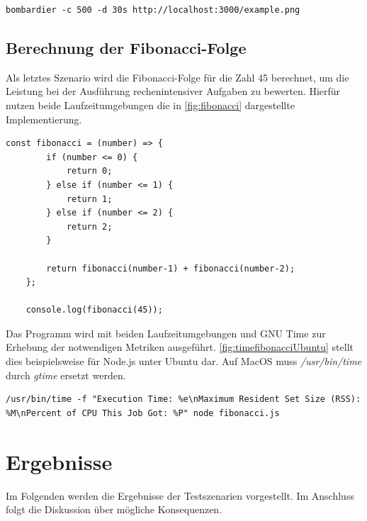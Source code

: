 \begin{lstlisting}[caption={[Bombardier Datei-Server]Bombardier Datei-Server\\\textit{Quelle: Eigene Darstellung}},label={fig:bombardierFileServer}]
	bombardier -c 500 -d 30s http://localhost:3000/example.png
\end{lstlisting}

\subsection{Berechnung der Fibonacci-Folge} \label{subsec:fibonacci}
Als letztes Szenario wird die Fibonacci-Folge für die Zahl 45 berechnet, um die Leistung bei der Ausführung rechenintensiver Aufgaben zu bewerten. Hierfür nutzen beide Laufzeitumgebungen die in \autoref{fig:fibonacci} dargestellte Implementierung.

\begin{lstlisting}[caption={[Berechnung der Fibonacci-Folge]Berechnung der Fibonacci-Folge\\\textit{Quelle: Eigene Darstellung}},label={fig:fibonacci}]
	const fibonacci = (number) => {
		if (number <= 0) {
			return 0;
		} else if (number <= 1) {
			return 1;
		} else if (number <= 2) {
			return 2;
		}
		
		return fibonacci(number-1) + fibonacci(number-2);
	};
	
	console.log(fibonacci(45));
\end{lstlisting}

\noindent
Das Programm wird mit beiden Laufzeitumgebungen und GNU Time zur Erhebung der notwendigen Metriken ausgeführt. \autoref{fig:timefibonacciUbuntu} stellt dies beispielsweise für Node.js unter Ubuntu dar. Auf MacOS muss \textit{/usr/bin/time} durch \textit{gtime} ersetzt werden.
\begin{lstlisting}[caption={[Messung der Fibonacci-Folge auf Ubuntu]Messung der Fibonacci-Folge auf Ubuntu\\\textit{Quelle: Eigene Darstellung}},label={fig:timefibonacciUbuntu}]
	/usr/bin/time -f "Execution Time: %e\nMaximum Resident Set Size (RSS): %M\nPercent of CPU This Job Got: %P" node fibonacci.js
\end{lstlisting}



\section{Ergebnisse} \label{sec:performance-results}
Im Folgenden werden die Ergebnisse der Testszenarien vorgestellt. Im Anschluss folgt die Diskussion über mögliche Konsequenzen.\\


